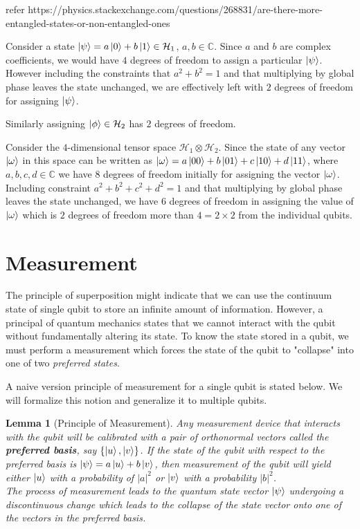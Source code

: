 \documentclass[12pt,twoside,fleqn]{report}
\makeatletter
\theoremstyle{thmstyle}
\renewenvironment{proof}[1][\proofname]{\par
\pushQED{\qed}%
\normalfont \topsep6\p@\@plus6\p@\relax
\trivlist
\item[\hskip\labelsep\itshape#1\@addpunct{.}]\mbox{}\par\nobreak\ignorespaces
}{%
    \popQED\endtrivlist\@endpefalse
    }
\newtheorem{lemma}{Lemma}[chapter]
\makeatother
\begin{document}
\begin{proof}[intuition]
    refer https://physics.stackexchange.com/questions/268831/are-there-more-entangled-states-or-non-entangled-ones 

    Consider a state $\ket{\psi} = a \ket{0} + b \ket{1} \in \mathcal{H}_1$, $a,b \in \mathbb{C}$. Since $a$ and $b$ are complex coefficients, we would have $4$ degrees of freedom to assign a particular $\ket{\psi}$. However including the constraints that $a^2 + b^2 = 1$ and that multiplying by global phase leaves the state unchanged, we are effectively left with $2$ degrees of freedom for assigning $\ket{\psi}$. 
    
Similarly assigning $\ket{\phi} \in \mathcal{H}_2$ has $2$ degrees of freedom.

    Consider the $4$-dimensional tensor space $\mathcal{H}_1 \otimes \mathcal{H}_2$. Since the state of any vector $\ket{\omega}$ in this space can be written as $\ket{\omega} = a \ket{00} + b \ket{01} + c \ket{10} + d \ket{11}$, where $a, b, c, d \in \mathbb{C}$ we have $8$ degrees of freedom initially for assigning the vector $\ket{\omega}$. Including constraint $a^2 + b^2 + c^2 + d^2 = 1$ and that multiplying by global phase leaves the state unchanged, we have $6$ degrees of freedom in assigning the value of $\ket{\omega}$ which is $2$ degrees of freedom more than $4 = 2 \times 2$ from the individual qubits.
\end{proof}

\section{Measurement}
The principle of superposition might indicate that we can use the continuum state of single qubit to store an infinite amount of information. However, a principal of quantum mechanics states that we cannot interact with the qubit without fundamentally altering its state. To know the state stored in a qubit, we must perform a measurement which forces the state of the qubit to "collapse" into one of two \textit{preferred states}.

A naive version principle of measurement for a single qubit is stated below. We will formalize this notion and generalize it to multiple qubits.
\begin{lemma}[Principle of Measurement]
    Any measurement device that interacts with the qubit will be calibrated with a pair of orthonormal vectors called the \textbf{preferred basis}, say $\{ \ket{u}, \ket{v} \}$. If the state of the qubit with respect to the preferred basis is $\ket{\psi} = a \ket{u} + b \ket{v}$, then measurement of the qubit will yield either $\ket{u}$ with a probability of $|a|^2$ or $\ket{v}$ with a probability $|b|^2$. \\
The process of measurement leads to the quantum state vector $\ket{\psi}$ undergoing a discontinuous change which leads to the collapse of the state vector onto one of the vectors in the preferred basis.
\end{lemma}
\end{document}
